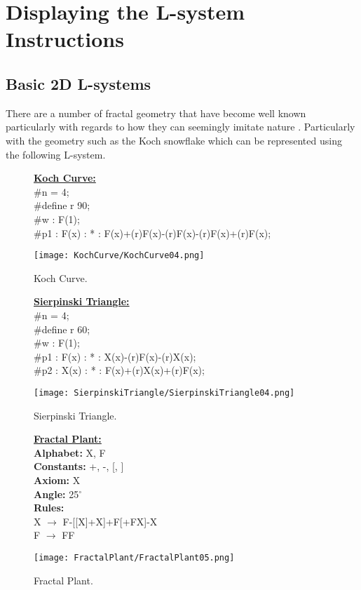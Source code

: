 \section{Displaying the L-system Instructions} \label{Display L-system Instructions}

\subsection{Basic 2D L-systems} 

There are a number of fractal geometry that have become well known particularly with regards to how they can seemingly imitate nature \cite{mandelbrot1982fractal}. Particularly with the geometry such as the Koch snowflake which can be represented using the following L-system.

\begin{figure}[htbp]
	\raggedright
	\textbf{\underline{Koch Curve:}} \\
	\#n = 4; \\
	\#define r 90; \\
	\#w : F(1); \\
	\#p1 : F(x) : * : F(x)+(r)F(x)-(r)F(x)-(r)F(x)+(r)F(x);\\
	{\centering
		\vspace{7px}
		\texttt{[image: KochCurve/KochCurve04.png]}
		\caption{Koch Curve.}
	}
\end{figure}
\begin{figure}[htbp]
	\raggedright
	\textbf{\underline{Sierpinski Triangle:}} \\
	\#n = 4;\\
	\#define r 60;\\
	\#w : F(1);\\
	\#p1 : F(x) : * : X(x)-(r)F(x)-(r)X(x);\\
	\#p2 : X(x) : * : F(x)+(r)X(x)+(r)F(x);\\
	{\centering
		\vspace{7px}
		\texttt{[image: SierpinskiTriangle/SierpinskiTriangle04.png]}
		\caption{Sierpinski Triangle.}
	}
\end{figure}
\begin{figure}[htbp]
	\raggedright
	\textbf{\underline{Fractal Plant:}} \\
	\textbf{Alphabet:} X, F\\
	\textbf{Constants:} +, -, [, ] \\
	\textbf{Axiom:} X \\
	\textbf{Angle:} 25$^\circ$ \\
	\textbf{Rules:} \\
	X $\rightarrow$ F-[[X]+X]+F[+FX]-X\\
	F $\rightarrow$ FF \\
	{\centering
		\vspace{7px}
		\texttt{[image: FractalPlant/FractalPlant05.png]}
		\caption{Fractal Plant.}
	}
\end{figure}
